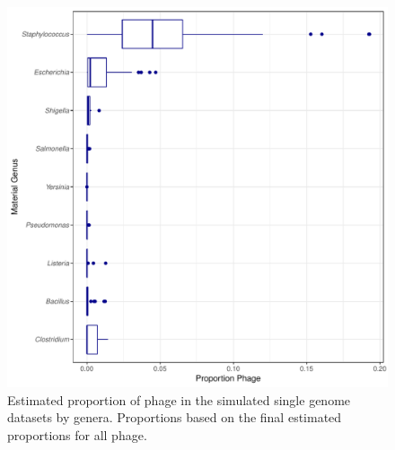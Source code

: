 \documentclass[fleqn,10pt,lineno]{wlpeerj}\usepackage[]{graphicx}\usepackage[]{color}
\makeatletter
\def\maxwidth{ %
  \ifdim\Gin@nat@width>\linewidth
    \linewidth
  \else
    \Gin@nat@width
  \fi
}
\newenvironment{knitrout}{}{} %
\makeatother
\begin{document}



\begin{knitrout}
\color{fgcolor}\begin{figure}
\includegraphics[width=\maxwidth]{figure/phage_prop-1} \caption[Estimated proportion of phage in the simulated single genome datasets by genera]{Estimated proportion of phage in the simulated single genome datasets by genera.  Proportions based on the final estimated proportions for all phage.}\label{fig:phage_prop}
\end{figure}


\end{knitrout}
\end{document}
